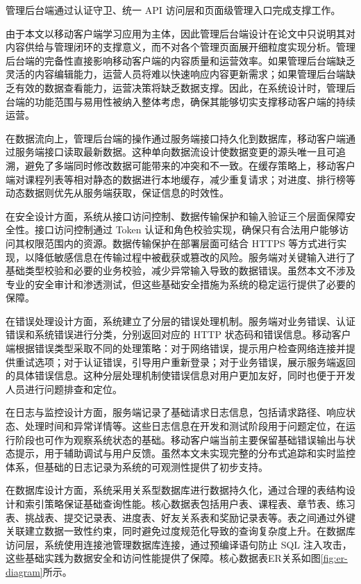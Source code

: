 管理后台端通过认证守卫、统一 API 访问层和页面级管理入口完成支撑工作。

由于本文以移动客户端学习应用为主体，因此管理后台端设计在论文中只说明其对内容供给与管理闭环的支撑意义，而不对各个管理页面展开细粒度实现分析。管理后台端的完备性直接影响移动客户端的内容质量和运营效率。如果管理后台端缺乏灵活的内容编辑能力，运营人员将难以快速响应内容更新需求；如果管理后台端缺乏有效的数据查看能力，运营决策将缺乏数据支撑。因此，在系统设计时，管理后台端的功能范围与易用性被纳入整体考虑，确保其能够切实支撑移动客户端的持续运营。

在数据流向上，管理后台端的操作通过服务端接口持久化到数据库，移动客户端通过服务端接口读取最新数据。这种单向数据流设计使数据变更的源头唯一且可追溯，避免了多端同时修改数据可能带来的冲突和不一致。在缓存策略上，移动客户端对课程列表等相对静态的数据进行本地缓存，减少重复请求；对进度、排行榜等动态数据则优先从服务端获取，保证信息的时效性。

在安全设计方面，系统从接口访问控制、数据传输保护和输入验证三个层面保障安全性。接口访问控制通过 Token 认证和角色校验实现，确保只有合法用户能够访问其权限范围内的资源。数据传输保护在部署层面可结合 HTTPS 等方式进行实现，以降低敏感信息在传输过程中被截获或篡改的风险。服务端对关键输入进行了基础类型校验和必要的业务校验，减少异常输入导致的数据错误。虽然本文不涉及专业的安全审计和渗透测试，但这些基础安全措施为系统的稳定运行提供了必要的保障。

在错误处理设计方面，系统建立了分层的错误处理机制。服务端对业务错误、认证错误和系统错误进行分类，分别返回对应的 HTTP 状态码和错误信息。移动客户端根据错误类型采取不同的处理策略：对于网络错误，提示用户检查网络连接并提供重试选项；对于认证错误，引导用户重新登录；对于业务错误，展示服务端返回的具体错误信息。这种分层处理机制使错误信息对用户更加友好，同时也便于开发人员进行问题排查和定位。

在日志与监控设计方面，服务端记录了基础请求日志信息，包括请求路径、响应状态、处理时间和异常详情等。这些日志信息在开发和测试阶段用于问题定位，在运行阶段也可作为观察系统状态的基础。移动客户端当前主要保留基础错误输出与状态提示，用于辅助调试与用户反馈。虽然本文未实现完整的分布式追踪和实时监控体系，但基础的日志记录为系统的可观测性提供了初步支持。

在数据库设计方面，系统采用关系型数据库进行数据持久化，通过合理的表结构设计和索引策略保证基础查询性能。核心数据表包括用户表、课程表、章节表、练习表、挑战表、提交记录表、进度表、好友关系表和奖励记录表等。表之间通过外键关联建立数据一致性约束，同时避免过度规范化导致的查询复杂度上升。在数据库访问层，系统使用连接池管理数据库连接，通过预编译语句防止 SQL 注入攻击，这些基础实践为数据安全和访问性能提供了保障。核心数据表ER关系如图\ref{fig:er-diagram}所示。

